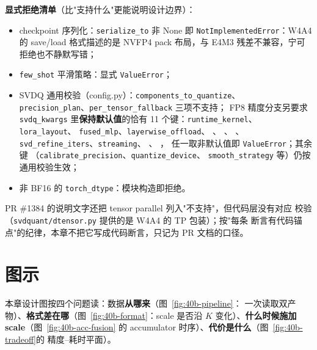 \textbf{显式拒绝清单}（比"支持什么"更能说明设计边界）：
\begin{itemize}[itemsep=1pt,topsep=2pt]
  \item checkpoint 序列化：\texttt{serialize\_to} 非 None 即
        \texttt{NotImplementedError}：W4A4 的 save/load 格式描述的是
        NVFP4 pack 布局，与 E4M3 残差不兼容，宁可拒绝也不静默写错；
  \item \texttt{few\_shot} 平滑策略：显式 \texttt{ValueError}；
  \item SVDQ 通用校验（config.py）：\texttt{components\_to\_quantize}、
        \texttt{precision\_plan}、\texttt{per\_tensor\_fallback} 三项不支持；
        FP8 精度分支另要求 \texttt{svdq\_kwargs} 里\textbf{保持默认值}的恰有
        11 个键：\texttt{runtime\_kernel}、\texttt{lora\_layout}、
        \texttt{fused\_mlp}、\texttt{layerwise\_offload}、
        、
        、
        、
        \texttt{svd\_refine\_iters}、\texttt{streaming}、
        、
        ，
        任一取非默认值即 \texttt{ValueError}；其余键
        （\texttt{calibrate\_precision}、\texttt{quantize\_device}、
        \texttt{smooth\_strategy} 等）仍按通用校验生效；
  \item 非 BF16 的 \texttt{torch\_dtype}：模块构造即拒绝。
\end{itemize}
PR \#1384 的说明文字还把 tensor parallel 列入"不支持"，但代码层没有对应
校验（\texttt{svdquant/dtensor.py} 提供的是 W4A4 的 TP 包装）；按"每条
断言有代码锚点"的纪律，本章不把它写成代码断言，只记为 PR 文档的口径。

\section{图示}

本章设计图按四个问题读：数据\textbf{从哪来}（图~\ref{fig:40b-pipeline}：
一次读取双产物）、\textbf{格式差在哪}（图~\ref{fig:40b-format}：scale
是否沿 $K$ 变化）、\textbf{什么时候施加 scale}（图~\ref{fig:40b-acc-fusion}
的 accumulator 时序）、\textbf{代价是什么}（图~\ref{fig:40b-tradeoff}的
精度--耗时平面）。

